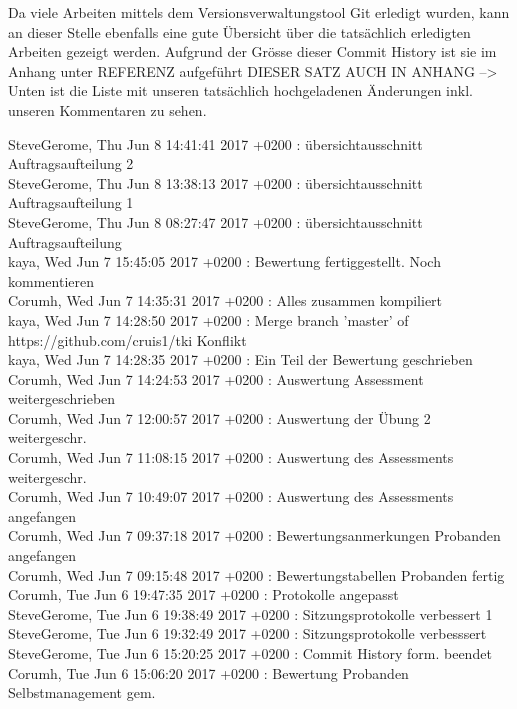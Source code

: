 Da viele Arbeiten mittels dem Versionsverwaltungstool Git erledigt wurden, kann an dieser Stelle ebenfalls eine gute Übersicht über die tatsächlich erledigten Arbeiten gezeigt werden. Aufgrund der Grösse dieser Commit History ist sie im Anhang unter REFERENZ aufgeführt DIESER SATZ AUCH IN ANHANG --> Unten ist die Liste mit unseren tatsächlich hochgeladenen Änderungen inkl. unseren Kommentaren zu sehen.

SteveGerome, Thu Jun 8 14:41:41 2017 +0200 : übersichtausschnitt Auftragsaufteilung 2 \\
SteveGerome, Thu Jun 8 13:38:13 2017 +0200 : übersichtausschnitt Auftragsaufteilung 1 \\
SteveGerome, Thu Jun 8 08:27:47 2017 +0200 : übersichtausschnitt Auftragsaufteilung \\
kaya, Wed Jun 7 15:45:05 2017 +0200 : Bewertung fertiggestellt. Noch kommentieren \\
Corumh, Wed Jun 7 14:35:31 2017 +0200 : Alles zusammen kompiliert \\
kaya, Wed Jun 7 14:28:50 2017 +0200 : Merge branch 'master' of https://github.com/cruis1/tki Konflikt \\
kaya, Wed Jun 7 14:28:35 2017 +0200 : Ein Teil der Bewertung geschrieben \\
Corumh, Wed Jun 7 14:24:53 2017 +0200 : Auswertung Assessment weitergeschrieben \\
Corumh, Wed Jun 7 12:00:57 2017 +0200 : Auswertung der Übung 2 weitergeschr. \\
Corumh, Wed Jun 7 11:08:15 2017 +0200 : Auswertung des Assessments weitergeschr. \\
Corumh, Wed Jun 7 10:49:07 2017 +0200 : Auswertung des Assessments angefangen \\
Corumh, Wed Jun 7 09:37:18 2017 +0200 : Bewertungsanmerkungen Probanden angefangen \\
Corumh, Wed Jun 7 09:15:48 2017 +0200 : Bewertungstabellen Probanden fertig \\
Corumh, Tue Jun 6 19:47:35 2017 +0200 : Protokolle angepasst \\
SteveGerome, Tue Jun 6 19:38:49 2017 +0200 : Sitzungsprotokolle verbessert 1 \\
SteveGerome, Tue Jun 6 19:32:49 2017 +0200 : Sitzungsprotokolle verbesssert \\
SteveGerome, Tue Jun 6 15:20:25 2017 +0200 : Commit History form. beendet \\
Corumh, Tue Jun 6 15:06:20 2017 +0200 : Bewertung Probanden Selbstmanagement gem. \\
